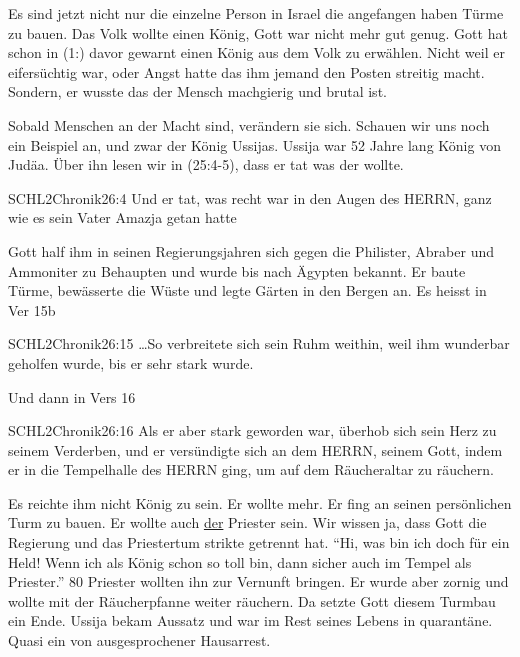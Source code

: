 \documentclass[14pt]{../../inc/mybib}
\newenvironment{block}[1][]{%
  \vspace{1.5em}%
  \noindent\textbf{#1}\par%
  \vspace{0.0em}%
}{%
  \vspace{1em}%
}
\begin{document}
\begin{block}

    Es sind jetzt nicht nur die einzelne Person in Israel die angefangen haben Türme zu bauen. Das Volk wollte einen König, Gott war nicht mehr gut genug. Gott hat schon in (1:) davor gewarnt einen König aus dem Volk zu erwählen. Nicht weil er eifersüchtig war, oder Angst hatte das ihm jemand den Posten streitig macht. Sondern, er wusste das der Mensch machgierig und brutal ist.
    
    Sobald Menschen an der Macht sind, verändern sie sich. Schauen wir uns noch ein Beispiel an, und zwar der König Ussijas. Ussija war 52 Jahre lang König von Judäa. Über ihn lesen wir in (25:4-5), dass er tat was der \herr{} wollte. 
    \begin{bibelbox}{SCHL}{2Chronik}{26:4}
        Und er tat, was recht war in den Augen des HERRN, ganz wie es sein Vater Amazja getan hatte
    \end{bibelbox} 
    Gott half ihm in seinen Regierungsjahren sich gegen die Philister, Abraber und Ammoniter zu Behaupten und wurde bis nach Ägypten bekannt. Er baute Türme, bewässerte die Wüste und legte Gärten in den Bergen an. Es heisst in Ver 15b
    \begin{bibelbox}{SCHL}{2Chronik}{26:15}
        \dots So verbreitete sich sein Ruhm weithin, weil ihm wunderbar geholfen wurde, bis er sehr stark wurde.
    \end{bibelbox} 

    Und dann in Vers 16
    \begin{bibelbox}{SCHL}{2Chronik}{26:16}
        Als er aber stark geworden war, überhob sich sein Herz zu seinem Verderben, und er versündigte sich an dem HERRN, seinem Gott, indem er in die Tempelhalle des HERRN ging, um auf dem Räucheraltar zu räuchern.
    \end{bibelbox} 
    Es reichte ihm nicht König zu sein. Er wollte mehr. Er fing an seinen persönlichen Turm zu bauen. Er wollte auch \underline{der} Priester sein. Wir wissen ja, dass Gott die Regierung und das Priestertum strikte getrennt hat. 
    \enquote{Hi, was bin ich doch für ein Held! Wenn ich als König schon so toll bin, dann sicher auch im Tempel als Priester.} 80 Priester wollten ihn zur Vernunft bringen. Er wurde aber zornig und wollte mit der Räucherpfanne weiter räuchern. Da setzte Gott diesem Turmbau ein Ende. Ussija bekam Aussatz und war im Rest seines Lebens in quarantäne. Quasi ein von ausgesprochener Hausarrest.
\end{block}
\end{document}
